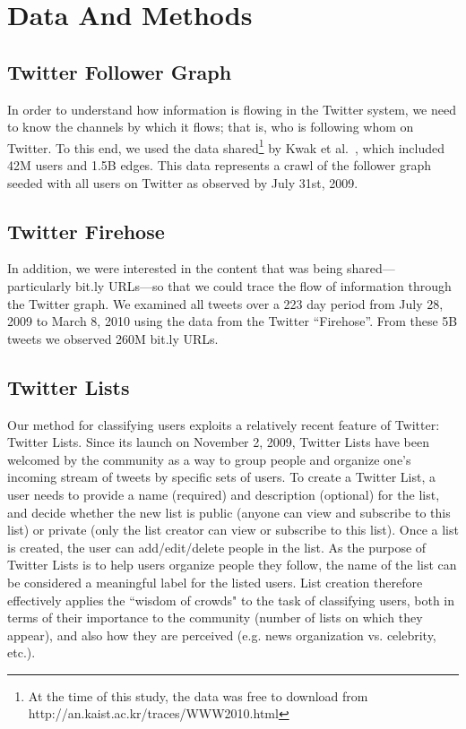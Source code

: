 \documentclass[phd,tocprelim]{cornell}
\begin{document}

\section{Data And Methods}
\subsection{Twitter Follower Graph}
\label{sec:follower}
In order to understand how information is flowing in the Twitter system, we
need to know the channels by which it flows; that is, who is following whom
on Twitter.  To this end, we used the data shared\footnote{At the time of this study, the data was free to download from http://an.kaist.ac.kr/traces/WWW2010.html} by Kwak et al.~\cite{kwak_10}, which included 42M users and 1.5B edges.  This data
represents a crawl of the follower graph seeded with all users on Twitter as observed by July 31st, 2009.

\subsection{Twitter Firehose}
\label{sec:firehose}
In addition, we were interested in the content that was being
shared---particularly bit.ly URLs---so that we could trace the flow of
information through the Twitter graph.  We examined all tweets over a 223
day period from July 28, 2009 to March 8, 2010 using the data from the
Twitter ``Firehose''.  From these 5B tweets we observed 260M bit.ly URLs.

\subsection{Twitter Lists}
\label{sec:classify}
Our method for classifying users exploits a relatively recent feature of
Twitter: Twitter Lists. Since its launch on November 2, 2009, Twitter Lists
have been welcomed by the community as a way to group people and organize
one's incoming stream of tweets by specific sets of users. To create a
Twitter List, a user needs to provide a name (required) and description
(optional) for the list, and decide whether the new list is public (anyone
can view and subscribe to this list) or private (only the list creator can
view or subscribe to this list). Once a list is created, the user can
add/edit/delete people in the list. As the purpose of Twitter Lists is to
help users organize people they follow, the name of the list can be
considered a meaningful label for the listed users.  List creation
therefore effectively applies the ``wisdom of crowds" to the task of
classifying users, both in terms of their importance to the community
(number of lists on which they appear), and also how they are perceived
(e.g. news organization vs. celebrity, etc.).
\end{document}
